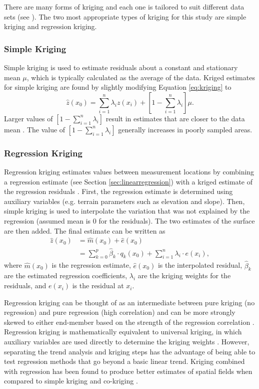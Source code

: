 \documentclass[12pt]{article}
\begin{document}
There are many forms of kriging and each one is tailored to suit different data sets (see \cite{Li2014}). The two most appropriate types of kriging for this study are simple kriging and regression kriging. 

\subsubsection{Simple Kriging}

Simple kriging is used to estimate residuals about a constant and stationary mean $\mu$, which is typically calculated as the average of the data. Kriged estimates for simple kriging are found by slightly modifying Equation \ref{eq:kriging} to 
\begin{equation}
\hat{z}(x_0) = \sum_{i=1}^{n} \lambda_i z(x_i) +\left[1-\sum_{i=1}^{n} \lambda_i \right]\mu.
\end{equation}
Larger values of $\left[1-\sum_{i=1}^{n} \lambda_i \right]$ result in estimates that are closer to the data mean \citep{Li2008}. The value of $\left[1-\sum_{i=1}^{n} \lambda_i \right]$ generally increases in poorly sampled areas. 

\subsubsection{Regression Kriging}

Regression kriging estimates values between measurement locations by combining a regression estimate (see Section \ref{sec:linearregression}) with a kriged estimate of the regression residuals \citep{Hengl2007}. First, the regression estimate is determined using auxiliary variables (e.g. terrain parameters such as elevation and slope). Then, simple kriging is used to interpolate the variation that was not explained by the regression (assumed mean is 0 for the residuals). The two estimates of the surface are then added. The final estimate can be written as 
\begin{align}
\hat{z}(x_0) &= \hat{m}(x_0) + \hat{e}(x_0)\\
& = \sum^p_{k=0}\hat{\beta}_k \cdot	q_k(x_0)+ \sum_{i=1}^{n} \lambda_i \cdot e(x_i),
\end{align}
where $\hat{m}(x_0)$ is the regression estimate, $\hat{e}(x_0)$ is the interpolated residual, $\hat{\beta}_k$ are the estimated regression coefficients, $\lambda_i$ are the kriging weights for the residuals, and $e(x_i)$ is the residual at $x_i$.

Regression kriging can be thought of as an intermediate between pure kriging (no regression) and pure regression (high correlation) and can be more strongly skewed to either end-member based on the strength of the regression correlation \citep{Hengl2007}. Regression kriging is mathematically equivalent to universal kriging, in which auxiliary variables are used directly to determine the kriging weights \citep{Hengl2007}. However, separating the trend analysis and kriging steps has the advantage of being able to test regression methods that go beyond a basic linear trend. Kriging combined with regression has been found to produce better estimates of spatial fields when compared to simple kriging and co-kriging \citep{Knotters1995}.
\end{document}
